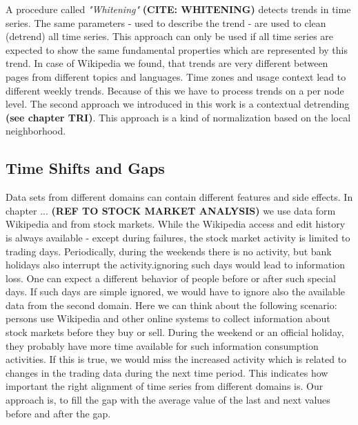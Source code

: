 \documentclass[a4paper,10pt]{scrbook}
\begin{document}
A procedure called \textit{"Whitening"} \textbf{(CITE: WHITENING)} detects trends in time series. The same parameters - used to describe the trend - are used to clean (detrend) all time series. This approach can only be used if all time series are expected to show the same fundamental properties which are represented by this trend. In case of Wikipedia we found, that trends are very different between pages from different topics and languages. Time zones and usage context lead to different weekly trends. Because of this we have to process trends on a per node level. The second approach we introduced in this work is a contextual detrending \textbf{(see chapter TRI)}. This approach is a kind of normalization based on the local neighborhood. 

\subsection{Time Shifts and Gaps}
Data sets from different domains can contain different features and side effects. In chapter ... \textbf{(REF TO STOCK MARKET ANALYSIS)} we use data form Wikipedia and from stock markets. While the Wikipedia access and edit history is always available - except during failures, the stock market activity is limited to trading days. Periodically, during the weekends there is no activity, but bank holidays also interrupt the activity.ignoring such days would lead to information loss. One can expect a different behavior of people before or after such special days. If such days are simple ignored, we would have to ignore also the available data from the second domain. Here we can think about the following scenario: persons use Wikipedia and other online systems to collect information about stock markets before they buy or sell. During the weekend or an official holiday, they probably have more time available for such information consumption activities. If this is true, we would miss the increased activity which is related to changes in the trading data during the next time period. This indicates how important the right alignment of time series from different domains is. Our approach is, to fill the gap with the average value of the last and next values before and after the gap. 

%
\end{document}
